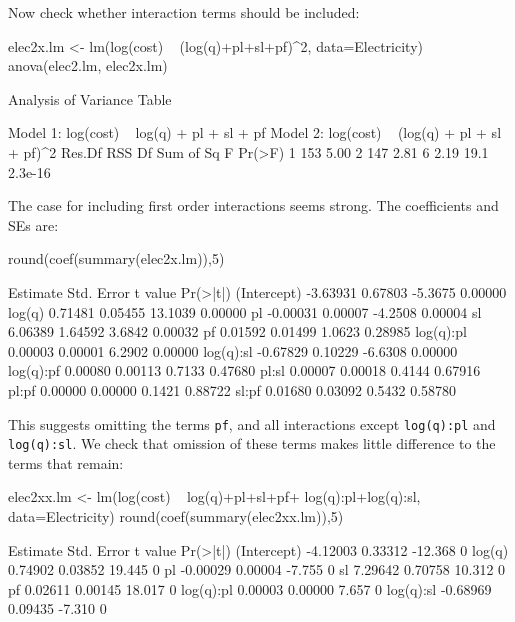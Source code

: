 \documentclass{tufte-book}\usepackage[]{graphicx}\usepackage[]{color}
\newcommand{\txtt}[1]{\texttt{#1}}
\begin{document}
Now check whether interaction terms should be included:
\begin{Schunk}
\begin{Sinput}
elec2x.lm <- lm(log(cost) ~ (log(q)+pl+sl+pf)^2,
                data=Electricity)
anova(elec2.lm, elec2x.lm)
\end{Sinput}
\begin{Soutput}
Analysis of Variance Table

Model 1: log(cost) ~ log(q) + pl + sl + pf
Model 2: log(cost) ~ (log(q) + pl + sl + pf)^2
  Res.Df  RSS Df Sum of Sq    F  Pr(>F)
1    153 5.00                          
2    147 2.81  6      2.19 19.1 2.3e-16
\end{Soutput}
\end{Schunk}
The case for including first order interactions seems strong. The
coefficients and SEs are:
\begin{Schunk}
\begin{Sinput}
round(coef(summary(elec2x.lm)),5)
\end{Sinput}
\begin{Soutput}
            Estimate Std. Error t value Pr(>|t|)
(Intercept) -3.63931    0.67803 -5.3675  0.00000
log(q)       0.71481    0.05455 13.1039  0.00000
pl          -0.00031    0.00007 -4.2508  0.00004
sl           6.06389    1.64592  3.6842  0.00032
pf           0.01592    0.01499  1.0623  0.28985
log(q):pl    0.00003    0.00001  6.2902  0.00000
log(q):sl   -0.67829    0.10229 -6.6308  0.00000
log(q):pf    0.00080    0.00113  0.7133  0.47680
pl:sl        0.00007    0.00018  0.4144  0.67916
pl:pf        0.00000    0.00000  0.1421  0.88722
sl:pf        0.01680    0.03092  0.5432  0.58780
\end{Soutput}
\end{Schunk}
This suggests omitting the terms \txtt{pf}, and all interactions
except \txtt{log(q):pl} and \txtt{log(q):sl}.  We check that omission
of these terms makes little difference to the terms that remain:
\begin{Schunk}
\begin{Sinput}
elec2xx.lm <- lm(log(cost) ~ log(q)+pl+sl+pf+
                 log(q):pl+log(q):sl,
                 data=Electricity)
round(coef(summary(elec2xx.lm)),5)
\end{Sinput}
\begin{Soutput}
            Estimate Std. Error t value Pr(>|t|)
(Intercept) -4.12003    0.33312 -12.368        0
log(q)       0.74902    0.03852  19.445        0
pl          -0.00029    0.00004  -7.755        0
sl           7.29642    0.70758  10.312        0
pf           0.02611    0.00145  18.017        0
log(q):pl    0.00003    0.00000   7.657        0
log(q):sl   -0.68969    0.09435  -7.310        0
\end{Soutput}
\end{Schunk}
\end{document}
